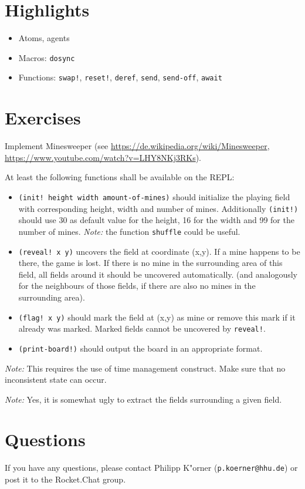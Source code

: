 \documentclass[11pt,a4paper]{article}
\begin{document}
\section{Highlights}

\begin{itemize}
    \item Atoms, agents
    \item Macros: \verb|dosync|
    \item Functions: \verb|swap!|, \verb|reset!|, \verb|deref|, \verb|send|, \verb|send-off|, \verb|await|
\end{itemize}



\section{Exercises}

\begin{exercise}[Minesweeper]
Implement Minesweeper (see \url{https://de.wikipedia.org/wiki/Minesweeper}, \url{https://www.youtube.com/watch?v=LHY8NKj3RKs}). 

At least the following functions shall be available on the REPL:

\begin{itemize}
\item \texttt{(init! height width amount-of-mines)} should initialize the playing field with corresponding height, width and number of mines.
Additionally \texttt{(init!)} should use 30 as default value for the height, 16 for the width and 99 for the number of mines.
\emph{Note:} the function \verb|shuffle| could be useful.
\item \texttt{(reveal! x y)} uncovers the field at coordinate (x,y). If a mine happens to be there, the game is lost.
If there is no mine in the surrounding area of this field, all fields around it should be uncovered automatically.
(and analogously for the neighbours of those fields, if there are also no mines in the surrounding area).
\item \texttt{(flag! x y)} should mark the field at (x,y) as mine or remove this mark if it already was marked.
Marked fields cannot be uncovered by \texttt{reveal!}.
\item \texttt{(print-board!)} should output the board in an appropriate format.
\end{itemize}

\emph{Note:} This requires the use of time management construct. Make sure that no inconsistent state can occur.

\emph{Note:} Yes, it is somewhat ugly to extract the fields surrounding a given field.

\end{exercise}


	\section*{Questions}
	If you have any questions, please contact Philipp K"orner (\texttt{p.koerner@hhu.de}) or post it to the Rocket.Chat group.
\end{document}
